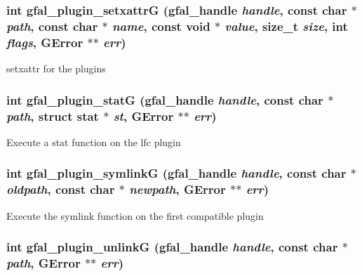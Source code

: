 \subsubsection{\setlength{\rightskip}{0pt plus 5cm}int gfal\_\-plugin\_\-setxattr\-G (gfal\_\-handle {\em handle}, const char $\ast$ {\em path}, const char $\ast$ {\em name}, const void $\ast$ {\em value}, size\_\-t {\em size}, int {\em flags}, GError $\ast$$\ast$ {\em err})}\label{gfal__common__plugin_8c_5bba59659f7b0e1a123db9d8b990b58c}


setxattr for the plugins 
\subsubsection{\setlength{\rightskip}{0pt plus 5cm}int gfal\_\-plugin\_\-stat\-G (gfal\_\-handle {\em handle}, const char $\ast$ {\em path}, struct stat $\ast$ {\em st}, GError $\ast$$\ast$ {\em err})}\label{gfal__common__plugin_8c_98b9e43ecd18ce2fc728d4a731e52ce1}


Execute a stat function on the lfc plugin 
\subsubsection{\setlength{\rightskip}{0pt plus 5cm}int gfal\_\-plugin\_\-symlink\-G (gfal\_\-handle {\em handle}, const char $\ast$ {\em oldpath}, const char $\ast$ {\em newpath}, GError $\ast$$\ast$ {\em err})}\label{gfal__common__plugin_8c_6ff9d39b564be7d0a560a09288e19b9e}


Execute the symlink function on the first compatible plugin 
\subsubsection{\setlength{\rightskip}{0pt plus 5cm}int gfal\_\-plugin\_\-unlink\-G (gfal\_\-handle {\em handle}, const char $\ast$ {\em path}, GError $\ast$$\ast$ {\em err})}\label{gfal__common__plugin_8c_1a4632c68c7d81f87071733081900dee}


